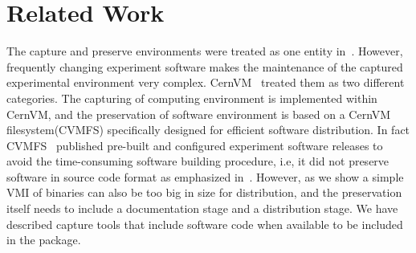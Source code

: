 \section{Related Work}


The capture and preserve environments were treated as one entity in~\cite{matthews2009towards,phelps2005no,hong2010software}. 
However, frequently changing experiment software makes the maintenance of the captured experimental environment very complex. 
CernVM~\cite{buncic2010cernvm} treated them as two different categories. 
The capturing of computing environment is implemented within CernVM, and the preservation of software environment is based on a CernVM filesystem(CVMFS) specifically designed for efficient software distribution.
In fact CVMFS~\cite{buncic2010cernvm} published pre-built and configured experiment software releases to avoid the time-consuming software building procedure, i.e, it did not 
preserve software in source code format as emphasized in~\cite{zabolitzky2002preserving,castagne2013consider}. 
However, as we show a simple VMI of binaries can also be too big in size for distribution, and the preservation itself needs to include a documentation stage and a distribution stage. 
We have described capture tools that include software code when available to be included in the package. 

